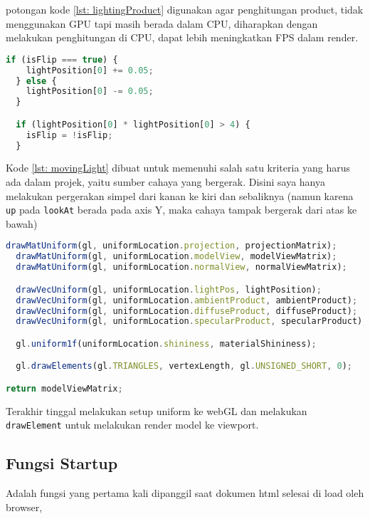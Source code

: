 potongan kode \ref{lst: lightingProduct} digunakan agar penghitungan product, tidak menggunakan GPU tapi masih berada dalam CPU, diharapkan dengan melakukan penghitungan di CPU, dapat lebih meningkatkan FPS dalam render.

\begin{lstlisting}[language=javascript, label={lst: movingLight}, caption={mengatur posisi sumber cahaya}]
  if (isFlip === true) {
    lightPosition[0] += 0.05;
  } else {
    lightPosition[0] -= 0.05;
  }

  if (lightPosition[0] * lightPosition[0] > 4) {
    isFlip = !isFlip;
  }

\end{lstlisting}

Kode \ref{lst: movingLight} dibuat untuk memenuhi salah satu kriteria yang harus ada dalam projek, yaitu sumber cahaya yang bergerak. Disini saya hanya melakukan pergerakan simpel dari kanan ke kiri dan sebaliknya (namun karena \texttt{up} pada \texttt{lookAt} berada pada axis Y, maka cahaya tampak bergerak dari atas ke bawah)

\begin{lstlisting}[language=javascript, label={lst: drawUniform}, caption={draw}]
  drawMatUniform(gl, uniformLocation.projection, projectionMatrix);
  drawMatUniform(gl, uniformLocation.modelView, modelViewMatrix);
  drawMatUniform(gl, uniformLocation.normalView, normalViewMatrix);

  drawVecUniform(gl, uniformLocation.lightPos, lightPosition);
  drawVecUniform(gl, uniformLocation.ambientProduct, ambientProduct);
  drawVecUniform(gl, uniformLocation.diffuseProduct, diffuseProduct);
  drawVecUniform(gl, uniformLocation.specularProduct, specularProduct);

  gl.uniform1f(uniformLocation.shininess, materialShininess);

  gl.drawElements(gl.TRIANGLES, vertexLength, gl.UNSIGNED_SHORT, 0);

return modelViewMatrix;
\end{lstlisting}

Terakhir tinggal melakukan setup uniform ke webGL dan melakukan \texttt{drawElement} untuk melakukan render model ke viewport.

\subsection*{Fungsi Startup}

Adalah fungsi yang pertama kali dipanggil saat dokumen html selesai di load oleh browser,


